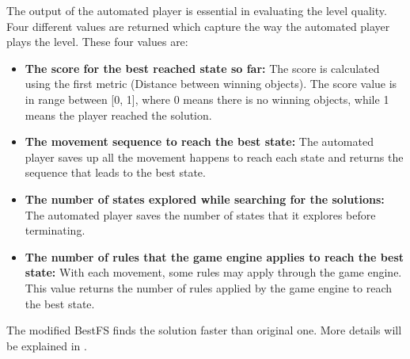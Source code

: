 The output of the automated player is essential in evaluating the level quality. Four different values are returned which capture the way the automated player plays the level. These four values are:
\begin{itemize} \itemsep0pt \parskip0pt 
	\item \textbf{The score for the best reached state so far:} The score is calculated using the first metric (Distance between winning objects). The score value is in range between [0, 1], where 0 means there is no winning objects, while 1 means the player reached the solution.
	\item \textbf{The movement sequence to reach the best state:} The automated player saves up all the movement happens to reach each state and returns the sequence that leads to the best state.
	\item \textbf{The number of states explored while searching for the solutions:} The automated player saves the number of states that it explores before terminating.
	\item \textbf{The number of rules that the game engine applies to reach the best state:} With each movement, some rules may apply through the game engine. This value returns the number of rules applied by the game engine to reach the best state.
\end{itemize}
The modified BestFS finds the solution faster than original one. More details will be explained in .\\\par


